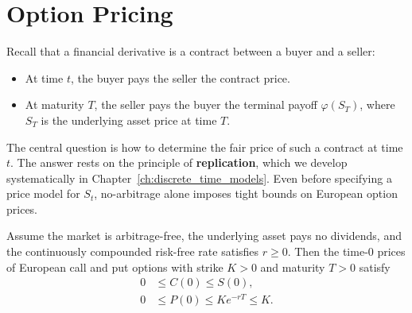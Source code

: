 \section{Option Pricing}

Recall that a financial derivative is a contract between a buyer and a seller:
\begin{itemize}
    \item At time $t$, the buyer pays the seller the contract price.
    \item At maturity $T$, the seller pays the buyer the terminal payoff $\varphi(S_T)$, where $S_T$ is the underlying asset price at time $T$.
\end{itemize}
The central question is how to determine the fair price of such a contract at time $t$. The answer rests on the principle of \textbf{replication}, which we develop systematically in Chapter~\ref{ch:discrete_time_models}. Even before specifying a price model for $S_t$, no-arbitrage alone imposes tight bounds on European option prices.

\begin{proposition}
\label{prop:arbitrage_bounds_ch1}
Assume the market is arbitrage-free, the underlying asset pays no dividends, and the continuously compounded risk-free rate satisfies $r \ge 0$. Then the time-$0$ prices of European call and put options with strike $K > 0$ and maturity $T > 0$ satisfy
\begin{align*}
    0 &\le C(0) \le S(0), \\
    0 &\le P(0) \le K e^{-rT} \le K.
\end{align*}
\end{proposition}

